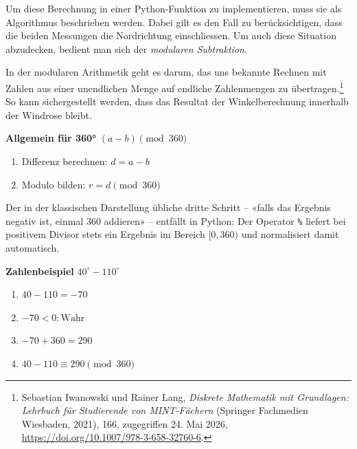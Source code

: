 \documentclass[
  nswissgerman,
  a4paper,
  DIV=11,
  numbers=noendperiod,
  ngerman]{scrreprt}
\providecommand{\tightlist}{%
  \setlength{\itemsep}{0pt}\setlength{\parskip}{0pt}}
\begin{document}
Um diese Berechnung in einer Python-Funktion zu implementieren, muss sie
als Algorithmus beschrieben werden. Dabei gilt es den Fall zu
berücksichtigen, dass die beiden Messungen die Nordrichtung
einschliessen. Um auch diese Situation abzudecken, bedient man sich der
\emph{modularen Subtraktion}.

\begin{tcolorbox}[enhanced jigsaw, arc=.35mm, bottomrule=.15mm, bottomtitle=1mm, breakable, colback=white, colbacktitle=quarto-callout-note-color!10!white, colframe=quarto-callout-note-color-frame, coltitle=black, left=2mm, leftrule=.75mm, opacityback=0, opacitybacktitle=0.6, rightrule=.15mm, title=\textcolor{quarto-callout-note-color}{\faInfo}\hspace{0.5em}{Modulare Subtraktion}, titlerule=0mm, toprule=.15mm, toptitle=1mm]

In der modularen Arithmetik geht es darum, das uns bekannte Rechnen mit
Zahlen aus einer unendlichen Menge auf endliche Zahlenmengen zu
übertragen.\footnote{Sebastian Iwanowski und Rainer Lang,
  \emph{{Diskrete Mathematik mit Grundlagen: Lehrbuch für Studierende
  von MINT-Fächern}} (Springer Fachmedien Wiesbaden, 2021), 166,
  zugegriffen 24. Mai 2026,
  \url{https://doi.org/10.1007/978-3-658-32760-6}.} So kann
sichergestellt werden, dass das Resultat der Winkelberechnung innerhalb
der Windrose bleibt.

\textbf{Allgemein für 360°} \((a - b) \pmod{360}\)

\begin{enumerate}
\def\labelenumi{\arabic{enumi}.}
\tightlist
\item
  Differenz berechnen: \(d = a - b\)
\item
  Modulo bilden: \(r = d \pmod{360}\)
\end{enumerate}

Der in der klassischen Darstellung übliche dritte Schritt -- «falls das
Ergebnis negativ ist, einmal \(360\) addieren» -- entfällt in Python:
Der Operator \texttt{\%} liefert bei positivem Divisor stets ein
Ergebnis im Bereich \([0, 360)\) und normalisiert damit automatisch.

\textbf{Zahlenbeispiel} \(40^{\circ} - 110^{\circ}\)

\begin{enumerate}
\def\labelenumi{\arabic{enumi}.}
\tightlist
\item
  \(40 - 110 = - 70\)
\item
  \(-70 < 0: \text{Wahr}\)
\item
  \(−70 + 360 = 290\)
\item
  \(40 − 110 \equiv 290 \pmod{360}\)
\end{enumerate}

\end{tcolorbox}
\end{document}
